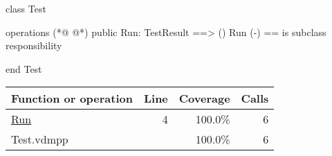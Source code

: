 \begin{vdmpp}[breaklines=true]
class Test

operations
(*@
\label{Run:4}
@*)
  public Run: TestResult ==> ()
  Run (-) == is subclass responsibility

end Test
\end{vdmpp}
\bigskip
\begin{longtable}{|l|r|r|r|}
\hline
Function or operation & Line & Coverage & Calls \\
\hline
\hline
\hyperref[Run:4]{Run} & 4&100.0\% & 6 \\
\hline
\hline
Test.vdmpp & & 100.0\% & 6 \\
\hline
\end{longtable}

